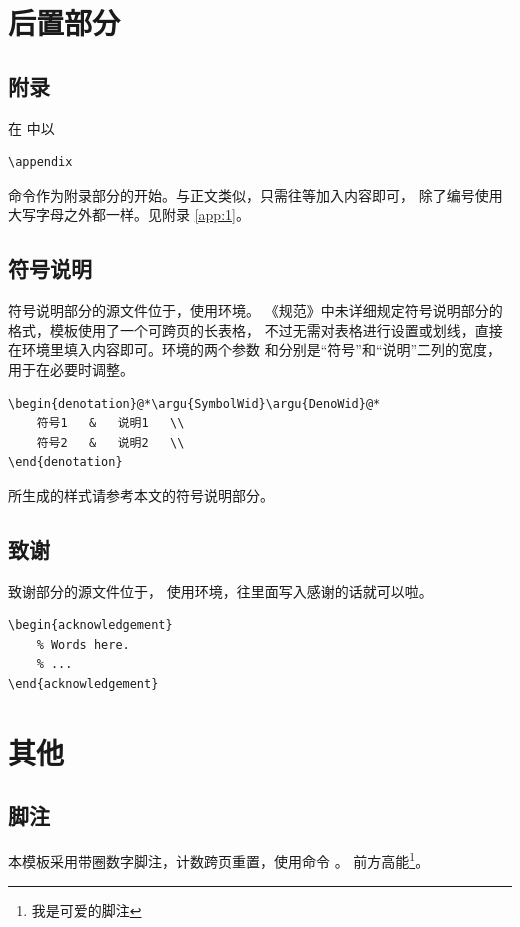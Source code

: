 \section{后置部分}\label{sec:backmatter}
\subsection{附录}\label{sec:app}
在  中以
\begin{lstlisting}[numbers=none]
\appendix
		\end{lstlisting}
命令作为附录部分的开始。与正文类似，只需往等加入内容即可，
除了编号使用大写字母之外都一样。见附录 \ref{app:1}。

\subsection{符号说明}\label{sec:deno}
符号说明部分的源文件位于，使用环境。
《规范》中未详细规定符号说明部分的格式，模板使用了一个可跨页的长表格，
不过无需对表格进行设置或划线，直接在环境里填入内容即可。环境的两个参数
和分别是“符号”和“说明”二列的宽度，用于在必要时调整。

\begin{lstlisting}
\begin{denotation}@*\argu{SymbolWid}\argu{DenoWid}@*
	符号1   &   说明1   \\
	符号2   &   说明2   \\
\end{denotation}
		\end{lstlisting}
所生成的样式请参考本文的符号说明部分。

\subsection{致谢}
致谢部分的源文件位于，
使用环境，往里面写入感谢的话就可以啦。
\begin{lstlisting}
\begin{acknowledgement}
	% Words here.
	% ...
\end{acknowledgement}
		\end{lstlisting}

\section{其他}\label{sec:other}

\subsection{脚注}\label{subsec:footnote}
本模板采用带圈数字脚注，计数跨页重置，使用命令 。
前方高能\footnote{我是可爱的脚注}。


